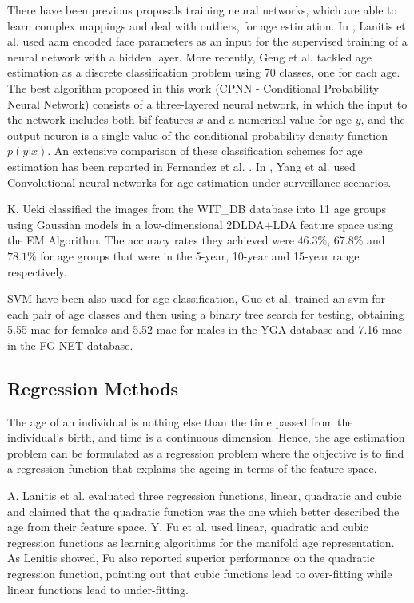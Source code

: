 There have been previous proposals training neural networks,
which are able to learn complex mappings and deal with
outliers, for age estimation. In \cite{Lanitis:2004:CDC:2225304.2226166}, Lanitis et al. used \gls{aam} encoded face parameters as an input for the supervised training
of a neural network with a hidden layer. More recently, Geng
et al. \cite{6475129} tackled age estimation as a discrete classification problem using 70 classes, one for each age. The best algorithm proposed in this work (CPNN - Conditional Probability Neural Network) consists of a three-layered neural network, in which the input to the network includes both \gls{bif} features $x$ and a numerical value for age $y$, and the output neuron is a single value of the conditional probability density function $p(y|x)$. An extensive comparison of these classification schemes for age estimation has been reported in Fernandez et al. \cite{2014icprw}. In \cite{5995481}, Yang et al. used Convolutional neural networks for age estimation under surveillance scenarios.

K. Ueki \cite{Ueki:2006:SAC:1126250.1126269} classified the images from the WIT\_DB database into 11 age groups using Gaussian models in a low-dimensional 2DLDA+LDA feature space using the EM Algorithm. The accuracy rates they achieved were $46.3\%$, $67.8\%$ and $78.1\%$ for age groups that were in the 5-year, 10-year and 15-year range respectively.

SVM have been also used for age classification, Guo et al. \cite{4544009} \cite{Guo:2008:IHA:2319085.2321608} trained an \gls{svm} for each pair of age classes and then using a binary tree search for testing, obtaining 5.55 \gls{mae} for females and 5.52 \gls{mae} for males in the YGA database and 7.16 \gls{mae} in the FG-NET database. 


\subsection{Regression Methods}

The age of an individual is nothing else than the time passed from the individual's birth, and time is a continuous dimension. Hence, the age estimation problem can be formulated as a regression problem where the objective is to find a regression function that explains the ageing in terms of the feature space.

A. Lanitis et al. \cite{Lanitis:2004:CDC:2225304.2226166} evaluated three regression functions, linear, quadratic and cubic and claimed that the quadratic function was the one which better described the age from their feature space. Y. Fu et al. \cite{4523958} \cite{4284917} used linear, quadratic and cubic regression functions as learning algorithms for the manifold age representation. As Lenitis showed, Fu also reported superior performance on the quadratic regression function, pointing out that cubic functions lead to over-fitting while linear functions lead to under-fitting.

